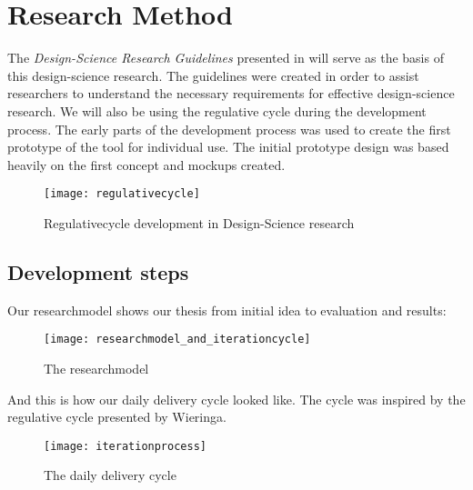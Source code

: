 %
%
\section{Research Method}


The \emph{Design-Science Research Guidelines} presented in \cite{Esearch2004} will serve as the basis of this design-science research. The guidelines were created in order to assist researchers to understand the necessary requirements for effective design-science research. We will also be using the regulative cycle\cite{wieringa} during the development process. The early parts of the development process was used to create the first prototype of the tool for individual use. The initial prototype design was based heavily on the first concept and mockups created. 
\begin{figure}[!htpb]
\label{regulativecycle}
\centering
	\texttt{[image: regulativecycle]}
\caption{Regulativecycle development in Design-Science research}
\end{figure}

\subsection{Development steps}
Our researchmodel shows our thesis from initial idea to evaluation and results:

\begin{figure}[!htpb]
\label{researchmodel}
\centering
	\texttt{[image: researchmodel\_and\_iterationcycle]}
\caption{The researchmodel}
\end{figure}
And this is how our daily delivery cycle looked like. The cycle was inspired by the regulative cycle presented by Wieringa\cite{wieringa}. 
\begin{figure}[!htpb]
\label{iterationprocess}
\centering
	\texttt{[image: iterationprocess]}
\caption{The daily delivery cycle}
\end{figure}

